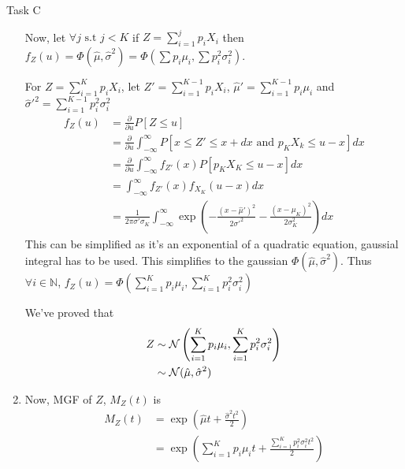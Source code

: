 \begin{task}{Task C}
\begin{enumerate}
		      Now, let $\forall j \text{ s.t }j<K$ if $Z=\sum_{i=1}^j p_iX_i$ then $f_Z(u) = \Phi(\hat{\mu}, \hat{\sigma}^2) = \Phi(\sum p_i\mu_i, \sum p_i^2\sigma_i^2)$.

		      For $Z = \sum_{i=1}^K p_iX_i$, let $Z' = \sum_{i=1}^{K-1} p_iX_i$, $\hat{\mu}' = \sum_{i=1}^{K-1}p_i\mu_i$ and $\hat{\sigma}'^2 = \sum_{i=1}^{K-1}p_i^2\sigma_i^2$
		      \begin{align}
			      f_Z(u) & = \frac{\partial}{\partial u}P[Z\leq u]                                                                                                        \\
			             & = \frac{\partial}{\partial u}\int_{-\infty}^{\infty} P[x \leq Z' \leq x+dx \text{ and } p_KX_k \leq u-x] dx                                    \\
			             & = \frac{\partial}{\partial u}\int_{-\infty}^\infty f_{Z'}(x)P[p_KX_K\leq u-x]dx                                                                \\
			             & = \int_{-\infty}^\infty f_{Z'}(x)f_{X_K}(u-x)dx                                                                                                \\
			             & = \frac{1}{2\pi\sigma'\sigma_K}\int_{-\infty}^\infty \exp\left(-\frac{(x-\hat{\mu}')^2}{2\sigma'^2} - \frac{(x-\mu_K)^2}{2\sigma_K^2}\right)dx
		      \end{align}
		      This can be simplified as it's an exponential of a quadratic equation,
		      gaussial integral has to be used. This simplifies to the gaussian
		      $\Phi(\hat{\mu}, \hat{\sigma}^2)$. Thus $\forall i\in \mathbb{N}$,
		      $f_Z(u) = \Phi(\sum_{i=1}^Kp_i\mu_i, \sum_{i=1}^Kp_i^2\sigma_i^2)$

		      We've proved that
		      \begin{align}
			      Z & \sim \mathcal{N}\left(\sum_{i=1}^Kp_i\mu_i, \sum_{i=1}^Kp_i^2\sigma_i^2\right) \\
			        & \sim \mathcal{N}(\hat{\mu}, \hat{\sigma}^2)
		      \end{align}

		\item Now, MGF of $Z$, $M_Z(t)$ is
		      \begin{align}
			      M_Z(t) & = \exp\left(\hat{\mu}t + \frac{\hat{\sigma}^2t^2}{2}\right)                             \\
			             & = \exp\left(\sum_{i=1}^K p_i\mu_i t + \frac{\sum_{i=1}^K p_i^2\sigma_i^2 t^2}{2}\right)
		      \end{align}


\end{enumerate}
\end{task}
